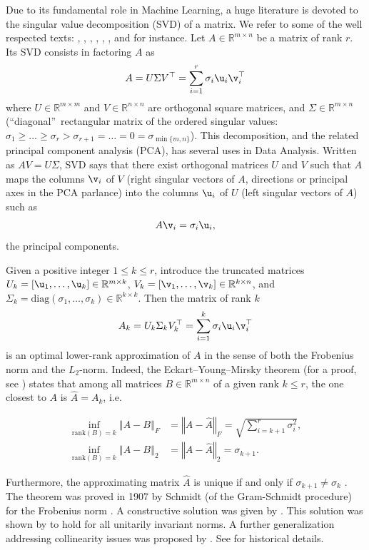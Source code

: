 Due to its fundamental role in Machine Learning, a huge literature is devoted
to the singular value decomposition (SVD) of a matrix. We refer to some of the
well respected texts: \cite{strang1993introduction}, \cite{trefethen1997numerical}, \cite{watkins2004fundamentals}, \cite{gentle2007matrix}, \cite{elden2007matrix}, \cite{lange2010numerical},
and \cite{yanai2011projection} for
instance. Let $A\in \mathbb{R}^{m\times n}$ be a matrix of rank $r$. Its SVD consists in factoring $A$ as
\[
A=U\Sigma V^\top=\sum_{i=1}^{r}\sigma_{i}\u_{i}\v_{i}^\top
\]
where $U\in\mathbb{R}^{m\times m}$ and $V\in\mathbb{R}^{n\times n}$ are orthogonal square matrices, and $\Sigma\in\mathbb{R}^{m\times n}$ (\textquotedblleft diagonal\textquotedblright\ rectangular matrix of the ordered singular values: $\sigma_{1}\geq\ldots\geq\sigma _{r}>\sigma_{r+1}=\ldots=0=\sigma_{\min\{m,n\}}$). This
decomposition, and the related principal component analysis (PCA), has several
uses in Data Analysis. Written as $AV=U\Sigma$, SVD says that there exist orthogonal matrices $U$ and $V$ such that $A$ maps the columns $\v_{i}$ of $V$ (right singular vectors of $A$, directions or principal axes in the PCA parlance) into the columns $\u_{i}$ of $U$ (left singular vectors of $A$) such as
\[
A\v_{i}=\sigma_{i}\u_{i},
\]
the principal components.

Given a positive integer $1\leq k\leq r$, introduce the truncated matrices
$U_{k}=\left[  \u_{1},\ldots,\u_{k}\right]  \in \mathbb{R}^{m\times k}$, $V_{k}=\left[  \v_{1},\ldots,\v_{k}\right]  \in \mathbb{R}^{k\times n}$, and $\Sigma_{k}=\mathrm{diag}(  \sigma_{1},\ldots,\sigma_{k}) \in \mathbb{R}^{k\times k}$. Then the matrix of rank $k$
\[
A_{k}=U_{k}\Sigma_{k}V_{k}^\top=\sum_{i=1}^{k}\sigma_{i}\u_{i}\v_{i}^\top
\]
is an optimal lower-rank approximation of $A$ in the sense of both the
Frobenius norm and the $L_2$-norm. Indeed, the Eckart--Young--Mirsky theorem (for
a proof, see \cite{markovsky2012low}) states that among all matrices $B\in\mathbb{R}^{m\times n}$ of a given rank $k\leq r$, the one closest to $A$ is
$\hat{A}=A_{k}$, i.e.

\begin{align*}
\inf_{\mathrm{rank}(B)=k}\left\Vert A-B\right\Vert _{F} &  =\left\Vert
A-\hat{A}\right\Vert _{F}=\sqrt{\sum_{i=k+1}^{r}\sigma_{i}^{2}},\\
\inf_{\mathrm{rank}(B)=k}\left\Vert A-B\right\Vert _{2} &  =\left\Vert
A-\hat{A}\right\Vert _{2}=\sigma_{k+1}.
\end{align*}

Furthermore, the approximating matrix $\hat{A}$ is unique if and only if
$\sigma_{k+1}\neq\sigma_{k}$ \citep{markovsky2012low}. The theorem was proved in 1907 by Schmidt (of the Gram-Schmidt procedure) for the Frobenius norm \citep{leon2013gram}. A constructive solution was given by \cite{eckart1936approximation}. This solution was
shown by \cite{mirsky1960symmetric} to hold for all unitarily invariant norms. A further generalization addressing collinearity issues was proposed by \cite{golub1987generalization}. See \cite{stewart1993early} for historical details. 

